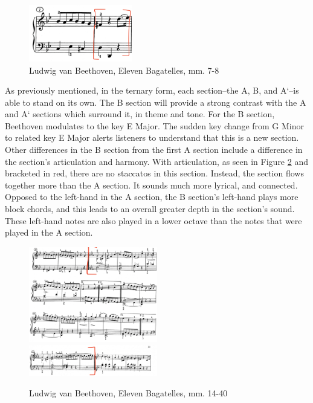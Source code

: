\begin{figure}[h]
	\centering
	\includegraphics[width=0.4\textwidth]{figures/beethoven-first-a-section-hc.jpg}
	\caption{Ludwig van Beethoven, Eleven Bagatelles, mm. 7-8}
	\label{fig:beethoven-first-a-section-hc}
\end{figure}

As previously mentioned, in the ternary form, each section--the A, B, and A`--is able to stand on its own. The B section will provide a strong contrast with the A and A` sections which surround it, in theme and tone. For the B section, Beethoven modulates to the key E\musFlat{} Major. The sudden key change from G Minor to related key E\musFlat{} Major alerts listeners to understand that this is a new section. Other differences in the B section from the first A section include a difference in the section's articulation and harmony. With articulation, as seen in Figure \ref{fig:beethoven-b-section}\autocite{Henle_1978} and bracketed in red, there are no staccatos in this section. Instead, the section flows together more than the A section. It sounds much more lyrical, and connected. Opposed to the left-hand in the A section, the B section's left-hand plays more block chords, and this leads to an overall greater depth in the section's sound. These left-hand notes are also played in a lower octave than the notes that were played in the A section.

\begin{figure}[h]
	\centering
	\includegraphics[width=0.5\textwidth]{figures/beethoven-b-section.jpg}
	\includegraphics[width=0.5\textwidth]{figures/beethoven-b-section-part-two.jpg}
	\caption{Ludwig van Beethoven, Eleven Bagatelles, mm. 14-40}
	\label{fig:beethoven-b-section}
\end{figure}

